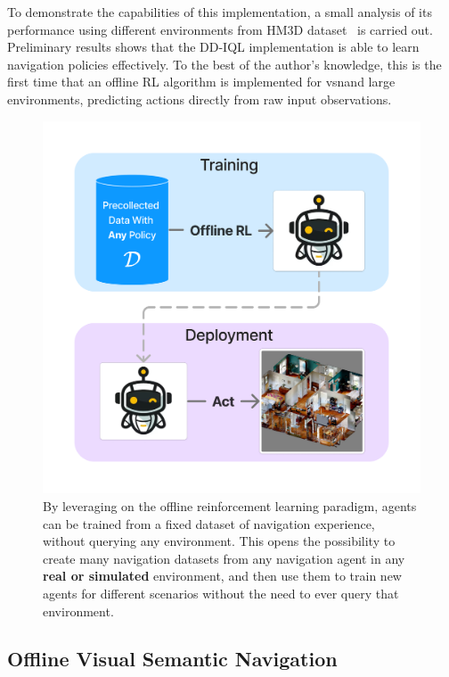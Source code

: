 To demonstrate the capabilities of this implementation, a small analysis of its performance using different environments from HM3D dataset~\cite{Ramakrishnan2021HabitatMatterport3D} is carried out.
Preliminary results shows that the DD-IQL implementation is able to learn navigation policies effectively.
To the best of the author's knowledge, this is the first time that an offline RL algorithm is implemented for \acrshort{vsn}\@ and large environments, predicting actions directly from raw input observations.

\begin{figure}
    \centering
    \includegraphics[width=0.7\linewidth]{figures/offnav/graphical_abstract}
    \caption{
        By leveraging on the offline reinforcement learning paradigm, agents can be trained from a fixed dataset of navigation experience, without querying any environment.
        This opens the possibility to create many navigation datasets from any navigation agent in any \textbf{real or simulated} environment, and then use them to train new agents for different scenarios without the need to ever query that environment.
    }
    \label{fig:abstract_offnav}
\end{figure}

\subsection{Offline Visual Semantic Navigation}\label{subsec:offline-navigation}

